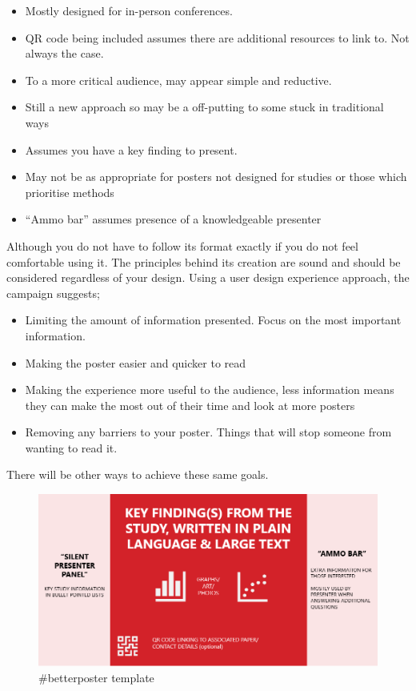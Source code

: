 \documentclass[
]{book}
\providecommand{\tightlist}{%
  \setlength{\itemsep}{0pt}\setlength{\parskip}{0pt}}
\begin{document}
\begin{itemize}
\tightlist
\item
  Mostly designed for in-person conferences.
\item
  QR code being included assumes there are additional resources to link to. Not always the case.
\item
  To a more critical audience, may appear simple and reductive.
\item
  Still a new approach so may be a off-putting to some stuck in traditional ways
\item
  Assumes you have a key finding to present.
\item
  May not be as appropriate for posters not designed for studies or those which prioritise methods
\item
  ``Ammo bar'' assumes presence of a knowledgeable presenter
\end{itemize}

Although you do not have to follow its format exactly if you do not feel comfortable using it. The principles behind its creation are sound and should be considered regardless of your design. Using a user design experience approach, the campaign suggests;

\begin{itemize}
\tightlist
\item
  Limiting the amount of information presented. Focus on the most important information.
\item
  Making the poster easier and quicker to read
\item
  Making the experience more useful to the audience, less information means they can make the most out of their time and look at more posters
\item
  Removing any barriers to your poster. Things that will stop someone from wanting to read it.
\end{itemize}

There will be other ways to achieve these same goals.

\begin{figure}
\centering
\includegraphics{img/Better Poster template.png}
\caption{\#betterposter template}
\end{figure}
\end{document}
